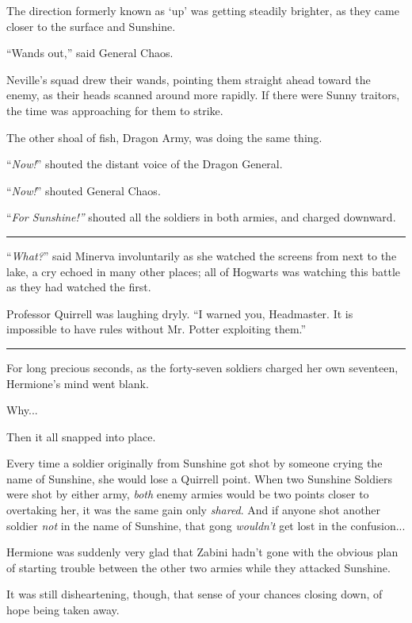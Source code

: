 The direction formerly known as `up' was getting steadily brighter, as they came closer to the surface and Sunshine.

``Wands out,'' said General Chaos.

Neville's squad drew their wands, pointing them straight ahead toward the enemy, as their heads scanned around more rapidly. If there were Sunny traitors, the time was approaching for them to strike.

The other shoal of fish, Dragon Army, was doing the same thing.

``\emph{Now!}'' shouted the distant voice of the Dragon General.

``\emph{Now!}'' shouted General Chaos.

``\emph{For Sunshine!''} shouted all the soldiers in both armies, and charged downward.

\begin{center}\rule{3in}{0.4pt}\end{center}

``\emph{What?}'' said Minerva involuntarily as she watched the screens from next to the lake, a cry echoed in many other places; all of Hogwarts was watching this battle as they had watched the first.

Professor Quirrell was laughing dryly. ``I warned you, Headmaster. It is impossible to have rules without Mr. Potter exploiting them.''

\begin{center}\rule{3in}{0.4pt}\end{center}

For long precious seconds, as the forty-seven soldiers charged her own seventeen, Hermione's mind went blank.

Why...

Then it all snapped into place.

Every time a soldier originally from Sunshine got shot by someone crying the name of Sunshine, she would lose a Quirrell point. When two Sunshine Soldiers were shot by either army, \emph{both} enemy armies would be two points closer to overtaking her, it was the same gain only \emph{shared}. And if anyone shot another soldier \emph{not} in the name of Sunshine, that gong \emph{wouldn't} get lost in the confusion...

Hermione was suddenly very glad that Zabini hadn't gone with the obvious plan of starting trouble between the other two armies while they attacked Sunshine.

It was still disheartening, though, that sense of your chances closing down, of hope being taken away.

